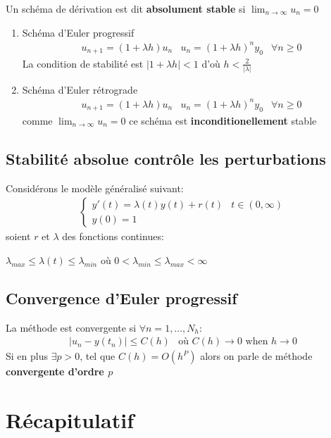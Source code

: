 Un schéma de dérivation est dit \textbf{absolument stable} si $\lim_{n\rightarrow\infty}u_n=0$

\begin{enumerate}
	\item Schéma d'Euler progressif
	\begin{eqnarray}
		u_{n+1}=(1+\lambda h)u_n&u_n=(1+\lambda h)^ny_0 &\forall n\geq 0
	\end{eqnarray}
	La condition de stabilité est $|1+\lambda h|<1$ d'où $h<\frac{2}{|\lambda|}$
	\item Schéma d'Euler rétrograde
	\begin{eqnarray}
		u_{n+1}=(1+\lambda h)u_n&u_n=(1+\lambda h)^ny_0 &\forall n\geq 0
	\end{eqnarray}
	comme $\lim_{n\rightarrow\infty}u_n=0$ ce schéma est \textbf{inconditionellement} stable
\end{enumerate}

\subsection{Stabilité absolue contrôle les perturbations}
Considérons le modèle généralisé suivant:
\begin{eqnarray}
	\begin{cases}
		y'(t)=\lambda(t)y(t)+r(t)&t\in(0,\infty)
		\\
		y(0)=1
	\end{cases}
\end{eqnarray}
soient $r$ et $\lambda$ des fonctions continues:

$\lambda_{max}\leq\lambda(t)\leq\lambda_{min}$ où $0<\lambda_{min}\leq\lambda_{max}<\infty$

\subsection{Convergence d'Euler progressif}
La méthode est convergente si $\forall n=1,\dots,N_h$:
\begin{eqnarray}
	|u_n-y(t_n)|\leq C(h)&\text{où } C(h)\rightarrow 0 \text{ when } h\rightarrow 0
\end{eqnarray}
Si en plus $\exists p>0$, tel que $C(h)=O(h^P)$ alors on parle de méthode \textbf{convergente d'ordre $p$}

\section{Récapitulatif}


